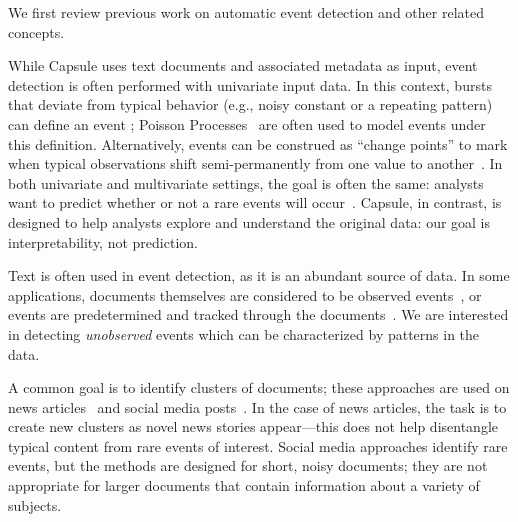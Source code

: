 











  We first review previous work on automatic event detection and other related concepts.  

While Capsule uses text documents and associated metadata as input, event detection is often performed with univariate input data.  In this context, bursts that deviate from typical behavior (e.g., noisy constant or a repeating pattern) can define an event \cite{kleinberg2003bursty,ihler2007learning}; Poisson Processes~\cite{Kingman:1993} are often used to model events under this definition.  Alternatively, events can be construed as ``change points'' to mark when typical observations shift semi-permanently from one value to another~\cite{guralnik1999event}.
In both univariate and multivariate settings, the goal is often the same: analysts want to predict whether or not a rare events will occur~\cite{weiss1998learning,das2008anomaly}.  Capsule, in contrast, is designed to help analysts explore and understand the original data: our goal is interpretability, not prediction.

Text is often used in event detection, as it is an abundant source of data.  
In some applications, documents themselves are considered to be observed events~\cite{mccallum1998comparison,peng2007event}, or events are predetermined and tracked through the documents~\cite{yang2000improving,VanDam:2012}.  We are interested in detecting \emph{unobserved} events which can be characterized by patterns in the data.

A common goal is to identify clusters of documents; these approaches are used on news articles~\cite{zhao2012novel,zhao2007temporal,zhang2002novelty,li2005probabilistic,wang2007mining,allan1998line} and social media posts~\cite{VanDam:2012,lau2012line,jackoway2011identification,sakaki2010earthquake,reuter2012event,becker2010learning,sayyadi2009event}.  
In the case of news articles, the task is to create new clusters as novel news stories appear---this does not help disentangle typical content from rare events of interest.
Social media approaches identify rare events, but the methods are designed for short, noisy documents; they are not appropriate for larger documents that contain information about a variety of subjects.

